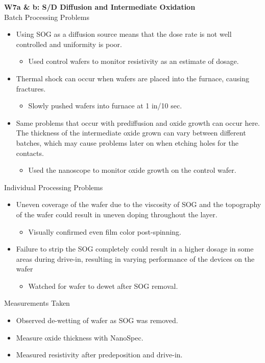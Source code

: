 \documentclass{article}
\begin{document}
\textbf{W7a \& b:  S/D Diffusion and Intermediate Oxidation} \\
Batch Processing Problems
\begin{itemize}
\item Using SOG as a diffusion source means that the dose rate is not well controlled and uniformity is poor. 
	\begin{itemize}
	\item Used control wafers to monitor resistivity as an estimate of dosage.
	\end{itemize}
\item Thermal shock can occur when wafers are placed into the furnace, causing fractures.
	\begin{itemize}
	\item Slowly pushed wafers into furnace at 1 in/10 sec.
	\end{itemize}
\item Same problems that occur with prediffusion and oxide growth can occur here. The thickness of the intermediate oxide grown can vary between different batches, which may cause problems later on when etching holes for the contacts.
	\begin{itemize}
	\item Used the nanoscope to monitor oxide growth on the control wafer.
	\end{itemize}
\end{itemize}
Individual Processing Problems
\begin{itemize}
\item Uneven coverage of the wafer due to the viscosity of SOG and the topography of the wafer could result in uneven doping throughout the layer. 
	\begin{itemize}
	\item Visually confirmed even film color post-spinning.
	\end{itemize}
\item Failure to strip the SOG completely could result in a higher dosage in some areas during drive-in, resulting in varying performance of the devices on the wafer
	\begin{itemize}
	\item Watched for wafer to dewet after SOG removal.
	\end{itemize}
\end{itemize}
Measurements Taken
\begin{itemize}
\item Observed de-wetting of wafer as SOG was removed.
\item Measure oxide thickness with NanoSpec. 
\item Measured resistivity after predeposition and drive-in.
\end{itemize}
\end{document}
